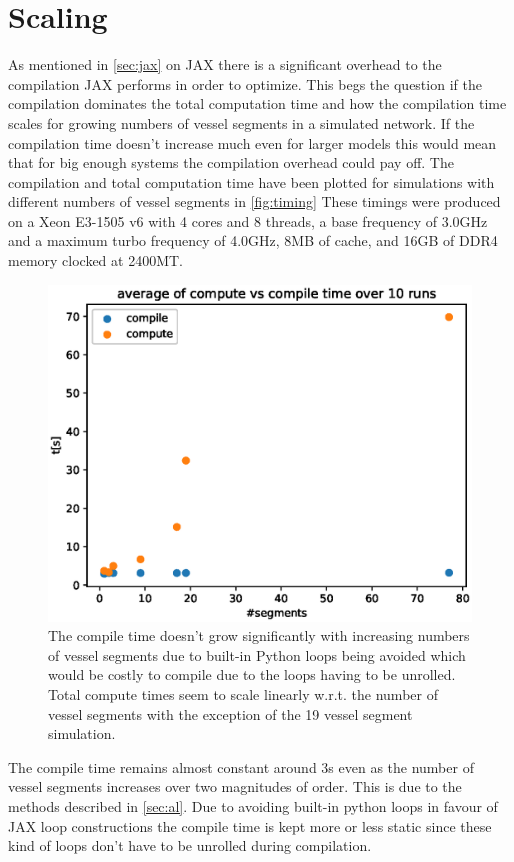 \documentclass[a4paper, oneside]{discothesis}
\begin{document}
\section{Scaling} \label{sec:sc}
As mentioned in \autoref{sec:jax} on JAX there is a significant overhead to the compilation JAX performs in order to optimize.
This begs the question if the compilation dominates the total computation time and how the compilation time scales for growing numbers of vessel segments in a simulated network.
If the compilation time doesn't increase much even for larger models this would mean that for big enough systems the compilation overhead could pay off.
The compilation and total computation time have been plotted for simulations with different numbers of vessel segments in \autoref{fig:timing}
These timings were produced on a Xeon E3-1505 v6 with 4 cores and 8 threads, a base frequency of 3.0GHz and a maximum turbo frequency of 4.0GHz, 8MB of cache, and 16GB of DDR4 memory clocked at 2400MT.
\begin{figure} [!ht]
	\centering
	\includegraphics[width=0.8\columnwidth]{figures/timing.eps}
	\caption{The compile time doesn't grow significantly with increasing numbers of vessel segments due to built-in Python loops being avoided which would be costly to compile due to the loops having to be unrolled. Total compute times seem to scale linearly w.r.t. the number of vessel segments with the exception of the 19 vessel segment simulation.}
	\label{fig:timing}
\end{figure}
The compile time remains almost constant around 3s even as the number of vessel segments increases over two magnitudes of order.
This is due to the methods described in \autoref{sec:al}.
Due to avoiding built-in python loops in favour of JAX loop constructions the compile time is kept more or less static since these kind of loops don't have to be unrolled during compilation.
\end{document}
